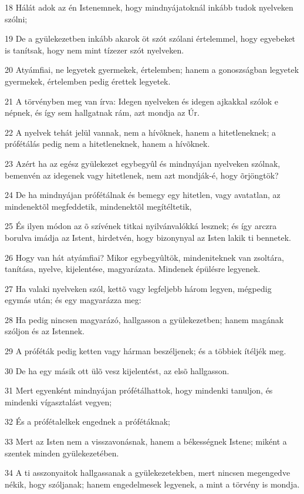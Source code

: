 \par 18 Hálát adok az én Istenemnek, hogy mindnyájatoknál inkább tudok nyelveken szólni;
\par 19 De a gyülekezetben inkább akarok öt szót szólani értelemmel, hogy egyebeket is tanítsak, hogy nem mint tízezer szót nyelveken.
\par 20 Atyámfiai, ne legyetek gyermekek, értelemben; hanem a gonoszságban legyetek gyermekek,  értelemben pedig érettek legyetek.
\par 21 A törvényben meg van írva: Idegen nyelveken és idegen ajkakkal szólok e népnek, és így sem hallgatnak rám, azt mondja az Úr.
\par 22 A nyelvek tehát jelül vannak, nem a hívõknek, hanem a hitetleneknek; a prófétálás pedig nem a hitetleneknek, hanem a hívõknek.
\par 23 Azért ha az egész gyülekezet egybegyûl és mindnyájan nyelveken szólnak, bemenvén az idegenek vagy hitetlenek, nem azt mondják-é, hogy õrjöngtök?
\par 24 De ha mindnyájan prófétálnak és bemegy egy hitetlen, vagy avatatlan, az mindenektõl megfeddetik, mindenektõl megítéltetik,
\par 25 És ilyen módon az õ szívének titkai nyilvánvalókká lesznek; és így arczra borulva imádja az Istent, hirdetvén, hogy bizonynyal az Isten lakik ti bennetek.
\par 26 Hogy van hát atyámfiai? Mikor egybegyûltök, mindeniteknek van zsoltára, tanítása,  nyelve, kijelentése, magyarázata. Mindenek épülésre legyenek.
\par 27 Ha valaki nyelveken szól, kettõ vagy legfeljebb három legyen, mégpedig egymás után; és egy magyarázza meg:
\par 28 Ha pedig nincsen magyarázó, hallgasson a gyülekezetben; hanem magának szóljon és az Istennek.
\par 29 A próféták pedig ketten vagy hárman beszéljenek; és a többiek ítéljék meg.
\par 30 De ha egy másik ott ülõ vesz kijelentést, az elsõ hallgasson.
\par 31 Mert egyenként mindnyájan prófétálhattok, hogy mindenki tanuljon, és mindenki vígasztalást vegyen;
\par 32 És a prófétalelkek engednek a prófétáknak;
\par 33 Mert az Isten nem a visszavonásnak, hanem a békességnek Istene; miként a szentek minden gyülekezetében.
\par 34 A ti asszonyaitok hallgassanak a gyülekezetekben, mert nincsen megengedve nékik, hogy szóljanak; hanem engedelmesek legyenek,  a mint a törvény is mondja.
